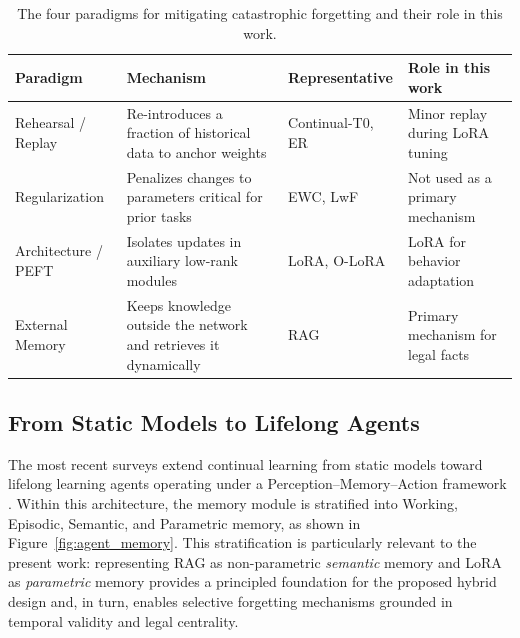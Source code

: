 \begin{table}[H]
\centering
\small
\caption{The four paradigms for mitigating catastrophic forgetting \parencite{wu2024continuallearninglargelanguage, shi2024continuallearninglargelanguage, guo2025continuallearninggenerativeai} and their role in this work.}
\label{tab:four_paradigms}
\begin{tabularx}{\textwidth}{>{\raggedright\arraybackslash}p{2.6cm} X >{\raggedright\arraybackslash}p{2.9cm} X}
\hline
\textbf{Paradigm} & \textbf{Mechanism} & \textbf{Representative} & \textbf{Role in this work} \\
\hline
Rehearsal / Replay & Re-introduces a fraction of historical data to anchor weights & Continual-T0, ER & Minor replay during LoRA tuning \\
Regularization & Penalizes changes to parameters critical for prior tasks & EWC, LwF & Not used as a primary mechanism \\
Architecture / PEFT & Isolates updates in auxiliary low-rank modules & LoRA, O-LoRA & LoRA for behavior adaptation \\
External Memory & Keeps knowledge outside the network and retrieves it dynamically & RAG & Primary mechanism for legal facts \\
\hline
\end{tabularx}
\end{table}

\subsection{From Static Models to Lifelong Agents}
The most recent surveys extend continual learning from static models toward lifelong learning agents operating under a Perception--Memory--Action framework \parencite{11328884}. Within this architecture, the memory module is stratified into Working, Episodic, Semantic, and Parametric memory, as shown in Figure~\ref{fig:agent_memory}. This stratification is particularly relevant to the present work: representing RAG as non-parametric \emph{semantic} memory and LoRA as \emph{parametric} memory provides a principled foundation for the proposed hybrid design and, in turn, enables selective forgetting mechanisms grounded in temporal validity and legal centrality.

